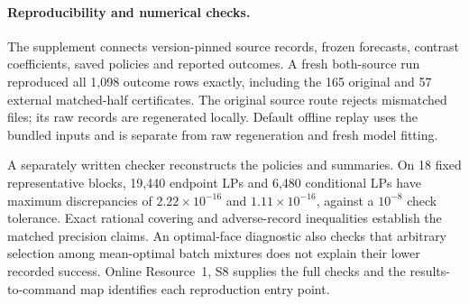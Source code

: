\paragraph{Reproducibility and numerical checks.}
The supplement connects version-pinned source records, frozen forecasts,
contrast coefficients, saved policies and reported outcomes. A fresh
both-source run reproduced all 1,098 outcome rows exactly, including the
165 original and 57 external matched-half certificates. The original
source route rejects mismatched files; its raw records are regenerated
locally. Default offline replay uses the bundled inputs and is separate
from raw regeneration and fresh model fitting.

A separately written checker reconstructs the policies and summaries. On
18 fixed representative blocks, 19,440 endpoint LPs and 6,480 conditional
LPs have maximum discrepancies of $2.22\times10^{-16}$ and
$1.11\times10^{-16}$, against a $10^{-8}$ check tolerance. Exact rational
covering and adverse-record inequalities establish the matched precision
claims. An optimal-face diagnostic also checks that arbitrary selection
among mean-optimal batch mixtures does not explain their lower recorded
success. Online Resource~1, S8 supplies the full checks and the
results-to-command map identifies each reproduction entry point.
